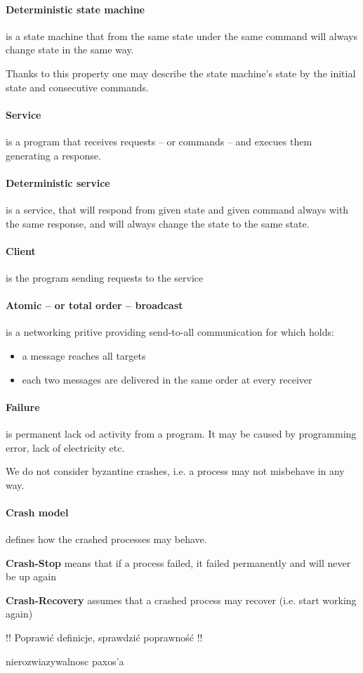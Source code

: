 \paragraph{Deterministic state machine}
is a state machine that from the same state under the same command will always change state in the same way.

Thanks to this property one may describe the state machine's state by the initial state and consecutive commands. 

\paragraph{Service}
is a program that receives requests -- or commands -- and execues them generating a response.

\paragraph{Deterministic service}
is a service, that will respond from given state and given command always with the same response, and will always change the state to the same state.

\paragraph{Client}
is the program sending requests to the service

\paragraph{Atomic -- or total order -- broadcast}
is a networking pritive providing send-to-all communication for which holds:
\begin{itemize}
 \item a message reaches all targets
 \item each two messages are delivered in the same order at every receiver
\end{itemize}

\paragraph{Failure}
is permanent lack od activity from a program. It may be caused by programming error, lack of electricity etc.

We do not consider byzantine crashes, i.e. a process may not misbehave in any way.

\paragraph{Crash model}
defines how the crashed processes may behave.
\begin{list}{}{ \setlength{\leftmargin}{0.2\textwidth} \setlength{\itemindent}{-0.1\textwidth}}
 \item[\textbf{Crash-Stop}] means that if a process failed, it failed permanently and will never be up again
 \item[\textbf{Crash-Recovery}] assumes that a crashed process may recover (i.e. start working again)
\end{list}


!! Poprawić definicje, sprawdzić poprawność !!


nierozwiazywalnosc paxos'a





